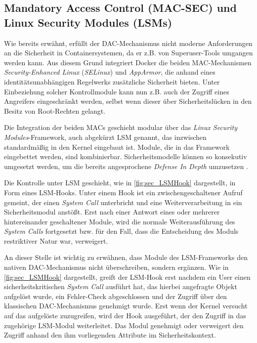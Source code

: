 \documentclass[../main.tex]{subfiles}
\begin{document}

    \subsection{Mandatory Access Control (\acrshort{MAC-SEC}) und Linux Security Modules (\acrshort{LSM}s)}
		\label{lsm}
			Wie bereits erwähnt, erfüllt der DAC-Mechanismus nicht moderne Anforderungen an die Sicherheit in Containersystemen, da er z.B. von Superuser-Tools umgangen werden kann. Aus diesem Grund integriert Docker die beiden MAC-Mechanismen \emph{Security-Enhanced Linux} (\emph{SELinux}) und \emph{AppArmor}, die anhand eines identitätsunabhängigen Regelwerks zusätzliche Sicherheit bieten. Unter Einbeziehung solcher Kontrollmodule kann nun z.B. auch der Zugriff eines Angreifers eingeschränkt werden, selbst wenn dieser über Sicherheitslücken in den Besitz von Root-Rechten gelangt.

			Die Integration der beiden MACs geschieht modular über das \emph{Linux Security Modules}-Framework, auch abgekürzt \acrshort{LSM} genannt, das inzwischen standardmäßig in den Kernel eingebaut ist. Module, die in das Framework eingebettet werden, sind kombinierbar. Sicherheitsmodelle können so konsekutiv umgesetzt werden, um die bereits angesprochene \emph{Defense In Depth} umzusetzen \cite[S.3]{LSMFramework}.

			Die Kontrolle unter LSM geschieht, wie in \fig \ref{fig:sec_LSMHook} dargestellt, in Form eines LSM-Hooks. Unter einem Hook ist ein zwischengeschaltener Aufruf gemeint, der einen \emph{System Call} unterbricht und eine Weiterverarbeitung in ein Sicherheitsmodul anstößt. Erst nach einer Antwort eines oder mehrerer hintereinander geschaltener Module, wird die normale Weiterausführung des \emph{System Calls} fortgesetzt bzw. für den Fall, dass die Entscheidung des Moduls restriktiver Natur war, verweigert.

			An dieser Stelle ist wichtig zu erwähnen, dass Module des LSM-Frameworks den nativen DAC-Mechanismus nicht überschreiben, sondern ergänzen. Wie in \fig \ref{fig:sec_LSMHook} dargestellt, greift der LSM-Hook erst nachdem ein User einen sicherheitskritischen \emph{System Call} ausführt hat, das hierbei angefragte Objekt aufgelöst wurde, ein Fehler-Check abgeschlossen und der Zugriff über den klassischen DAC-Mechanismus genehmigt wurde. Erst wenn der Kernel versucht auf das aufgelöste  zuzugreifen, wird der Hook ausgeführt, der den Zugriff in das zugehörige LSM-Modul weiterleitet. Das Modul genehmigt oder verweigert den Zugriff anhand den ihm vorliegenden Attribute im Sicherheitskontext.
\end{document}
